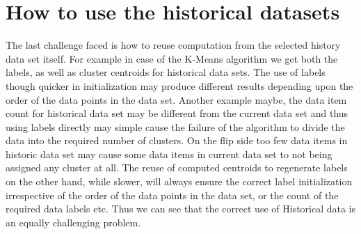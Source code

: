 \section{How to use the historical datasets}
The last challenge faced is how to reuse computation from the selected history data set itself. For example in case of the K-Means algorithm we get both the labels, as well as cluster centroids for historical data sets. The use of labels though quicker in initialization may produce different results depending upon the order of the data points in the data set.  Another example maybe, the data item count for historical data set may be different from the current data set and thus using labels directly may simple cause the failure of the algorithm to divide the data into the required number of clusters. On the flip side too few data items in historic data set may cause some data items in current data set to not being assigned any cluster at all. The reuse of computed centroids to regenerate labels on the other hand, while slower, will always ensure the correct label initialization irrespective of the order of the data points in the data set, or the count of the required data labels etc.
Thus we can see that the correct use of Historical data is an equally challenging problem.

